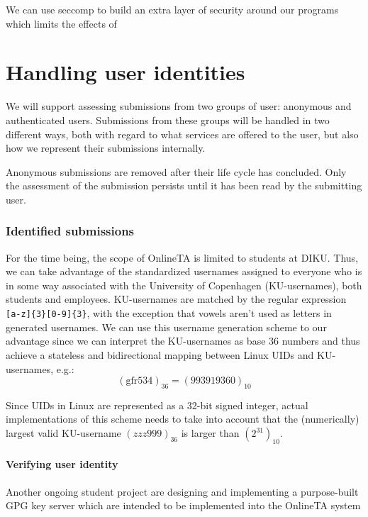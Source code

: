 We can use seccomp to build an extra layer of security around our
programs which limits the effects of 


\section{Handling user identities}
We will support assessing submissions from two groups of user:
anonymous and authenticated users. Submissions from these groups will
be handled in two different ways, both with regard to what services
are offered to the user, but also how we represent their submissions
internally.

Anonymous submissions are removed after their life cycle has
concluded. Only the assessment of the submission persists until it has
been read by the submitting user.


\subsubsection{Identified submissions}
For the time being, the scope of OnlineTA is limited to students at
DIKU. Thus, we can take advantage of the standardized usernames
assigned to everyone who is in some way associated with the University
of Copenhagen (KU-usernames), both students and
employees. KU-usernames are matched by the regular expression
\texttt{[a-z]\{3\}[0-9]\{3\}}, with the exception that vowels aren't used
as letters in generated usernames. We can use this
username generation scheme to our advantage since we can interpret the
KU-usernames as base 36 numbers and thus achieve a stateless and
bidirectional mapping between Linux UIDs and KU-usernames, e.g.:
\begin{equation*}
(\text{gfr534})_{36} = (993919360)_{10}
\end{equation*}

Since UIDs in Linux are represented as a 32-bit signed integer, actual
implementations of this scheme needs to take into account that the
(numerically) largest valid KU-username $(zzz999)_{36}$ is larger than
$(2^{31})_{10}$.

\paragraph{Verifying user identity}
Another ongoing student project are designing and implementing a
purpose-built GPG key server which are intended to be implemented into
the OnlineTA system


